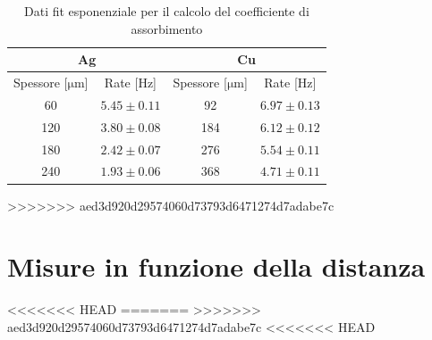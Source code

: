 \documentclass[twocolumn,10pt]{asme2ej}
\begin{document}
\begin{table}[t]
    \begin{center}
        \begin{tabular}{c c | c c}
            \multicolumn{2}{c}{\textbf{Ag}} & \multicolumn{2}{c}{\textbf{Cu}} \\ 
            \hline
            \multicolumn{1}{c}{Spessore [$\si{\micro\metre}$]} & \multicolumn{1}{c|}{Rate [Hz]} & \multicolumn{1}{c}{Spessore [$\si{\micro\metre}$]} & \multicolumn{1}{c}{Rate [Hz]} \\
            60                           & $5.45  \pm 0.11 $                    & 92                           & $6.97 \pm 0.13$                    \\
            120                          & $3.80  \pm 0.08 $                    & 184                          & $6.12 \pm 0.12$                    \\
            180                          & $2.42  \pm  0.07$                    & 276                          & $5.54 \pm 0.11$                      \\
            240                          & $1.93  \pm  0.06$                    & 368                          & $4.71 \pm 0.11$                      \\  
            \hline
        \end{tabular} 
    \end{center}
    \caption{Dati fit esponenziale per il calcolo del coefficiente di assorbimento}
    \label{t:assorbimento}
\end{table}

\clearpage
>>>>>>> aed3d920d29574060d73793d6471274d7adabe7c
\section{Misure in funzione della distanza}\label{s:distanza}


<<<<<<< HEAD
=======
>>>>>>> aed3d920d29574060d73793d6471274d7adabe7c
<<<<<<< HEAD
\end{document}
